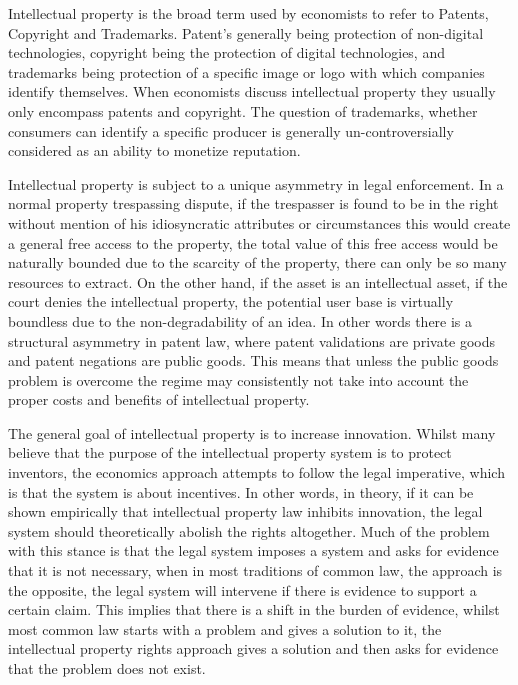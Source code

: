 \documentclass[12pt]{article}
\numberwithin{equation}{section}
\begin{document}
Intellectual property is the broad term used by economists to refer to Patents, Copyright and Trademarks. Patent's generally being protection of non-digital technologies, copyright being the protection of digital technologies, and trademarks being protection of a specific image or logo with which companies identify themselves. When economists discuss intellectual property they usually only encompass patents and copyright. The question of trademarks, whether consumers can identify a specific producer is generally un-controversially considered as an ability to monetize reputation.

Intellectual property is subject to a unique asymmetry in legal enforcement. In a normal property trespassing dispute, if the trespasser is found to be in the right without mention of his idiosyncratic attributes or circumstances this would create a general free access to the property, the total value of this free access would be naturally bounded due to the scarcity of the property, there can only be so many resources to extract. On the other hand, if the asset is an intellectual asset, if the court denies the intellectual property, the potential user base is virtually boundless due to the non-degradability of an idea. In other words there is a structural asymmetry in patent law, where patent validations are private goods and patent negations are public goods. This means that unless the public goods problem is overcome the regime may consistently not take into account the proper costs and benefits of intellectual property.

The general goal of intellectual property is to increase innovation. Whilst many believe that the purpose of the intellectual property system is to protect inventors, the economics approach attempts to follow the legal imperative, which is that the system is about incentives. In other words, in theory, if it can be shown empirically that intellectual property law inhibits innovation, the legal system should theoretically abolish the rights altogether. Much of the problem with this stance is that the legal system imposes a system and asks for evidence that it is not necessary, when in most traditions of common law, the approach is the opposite, the legal system will intervene if there is evidence to support a certain claim. This implies that there is a shift in the burden of evidence, whilst most common law starts with a problem and gives a solution to it, the intellectual property rights approach gives a solution and then asks for evidence that the problem does not exist.
\end{document}
